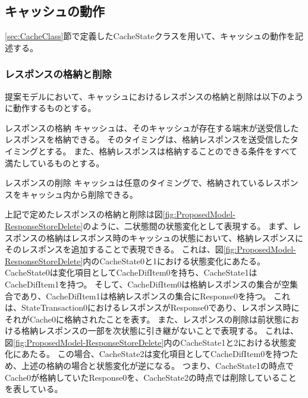 \documentclass[12pt,a4paper]{jbook}
\begin{document}
\subsection{キャッシュの動作}
\ref{sec:CacheClass}節で定義したCacheStateクラスを用いて、キャッシュの動作を記述する。

\subsubsection{レスポンスの格納と削除}
提案モデルにおいて、キャッシュにおけるレスポンスの格納と削除は以下のように動作するものとする。

\begin{itembox}[l]{レスポンスの格納}
キャッシュは、そのキャッシュが存在する端末が送受信したレスポンスを格納できる。
そのタイミングは、格納レスポンスを送受信したタイミングとする。
また、格納レスポンスは格納することのできる条件をすべて満たしているものとする。
\end{itembox}

\begin{itembox}[l]{レスポンスの削除}
キャッシュは任意のタイミングで、格納されているレスポンスをキャッシュ内から削除できる。
\end{itembox}

上記で定めたレスポンスの格納と削除は図\ref{fig:ProposedModel-ResponseStoreDelete}のように、二状態間の状態変化として表現する。
まず、レスポンスの格納はレスポンス時のキャッシュの状態において、格納レスポンスにそのレスポンスを追加することで表現できる。
これは、図\ref{fig:ProposedModel-ResponseStoreDelete}内のCacheState0と1における状態変化にあたる。
CacheState0は変化項目としてCacheDifItem0を持ち、CacheState1はCacheDifItem1を持つ。
そして、CacheDifItem0は格納レスポンスの集合が空集合であり、CacheDifItem1は格納レスポンスの集合にResponse0を持つ。
これは、StateTransaction0におけるレスポンスがResponse0であり、レスポンス時にそれがCache0に格納されたことを表す。
また、レスポンスの削除は前状態における格納レスポンスの一部を次状態に引き継がないことで表現する。
これは、図\ref{fig:ProposedModel-ResponseStoreDelete}内のCacheState1と2における状態変化にあたる。
この場合、CacheState2は変化項目としてCacheDifItem0を持つため、上述の格納の場合と状態変化が逆になる。
つまり、CacheState1の時点でCache0が格納していたResponse0を、CacheState2の時点では削除していることを表している。
\end{document}
